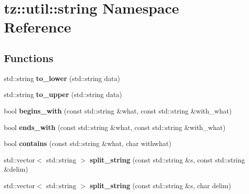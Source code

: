 \hypertarget{namespacetz_1_1util_1_1string}{}\section{tz\+:\+:util\+:\+:string Namespace Reference}
\label{namespacetz_1_1util_1_1string}
\subsection*{Functions}
\begin{DoxyCompactItemize}
\item 
\mbox{\label{namespacetz_1_1util_1_1string_ac8875376eab8973295be717f97a024ff}} 
std\+::string {\bfseries to\+\_\+lower} (std\+::string data)
\item 
\mbox{\label{namespacetz_1_1util_1_1string_a126d6261c5efc70e045675fe0ae06bdc}} 
std\+::string {\bfseries to\+\_\+upper} (std\+::string data)
\item 
\mbox{\label{namespacetz_1_1util_1_1string_a484fedf11818c514d04e78080d163f6a}} 
bool {\bfseries begins\+\_\+with} (const std\+::string \&what, const std\+::string \&with\+\_\+what)
\item 
\mbox{\label{namespacetz_1_1util_1_1string_a4514a8c01cb6b4899c45d267913a9371}} 
bool {\bfseries ends\+\_\+with} (const std\+::string \&what, const std\+::string \&with\+\_\+what)
\item 
\mbox{\label{namespacetz_1_1util_1_1string_a940088296a967680d6d6282b5ac18f86}} 
bool {\bfseries contains} (const std\+::string \&what, char withwhat)
\item 
\mbox{\label{namespacetz_1_1util_1_1string_aa023cee141a4590ef58d194661b36290}} 
std\+::vector$<$ std\+::string $>$ {\bfseries split\+\_\+string} (const std\+::string \&s, const std\+::string \&delim)
\item 
\mbox{\label{namespacetz_1_1util_1_1string_a2c900dcefbe22c77f810dc3413bc44ba}} 
std\+::vector$<$ std\+::string $>$ {\bfseries split\+\_\+string} (const std\+::string \&s, char delim)

\end{DoxyCompactItemize}
